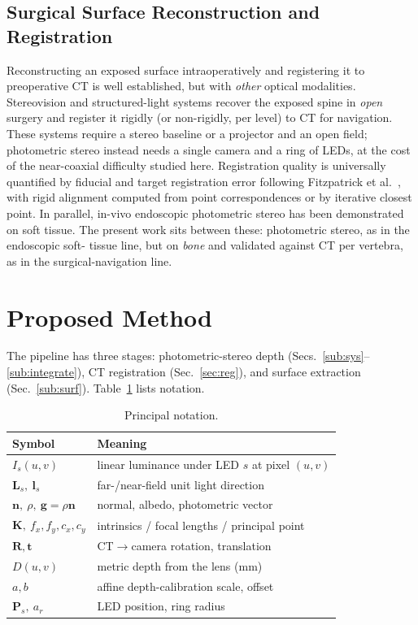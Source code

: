 \documentclass[journal]{IEEEtran}
\newcommand{\vn}{\bm{n}}
\newcommand{\vl}{\bm{l}}
\newcommand{\vL}{\bm{L}}
\newcommand{\vg}{\bm{g}}
\newcommand{\vP}{\bm{P}}
\newcommand{\R}{\bm{R}}
\newcommand{\tvec}{\bm{t}}
\newcommand{\K}{\bm{K}}
\begin{document}
\subsection{Surgical Surface Reconstruction and Registration}
Reconstructing an exposed surface intraoperatively and registering it to preoperative
CT is well established, but with \emph{other} optical modalities. Stereovision and
structured-light systems recover the exposed spine in \emph{open} surgery and register
it rigidly (or non-rigidly, per level) to CT for navigation. These systems require a
stereo baseline or a projector and an open field; photometric stereo instead needs a
single camera and a ring of LEDs, at the cost of the near-coaxial difficulty studied
here. Registration quality is universally quantified by fiducial and target
registration error following Fitzpatrick et al.~\cite{fitzpatrick}, with rigid
alignment computed from point correspondences or by iterative closest point. In
parallel, in-vivo endoscopic photometric stereo has been demonstrated on soft tissue.
The present work sits between these: photometric stereo, as in the endoscopic soft-
tissue line, but on \emph{bone} and validated against CT per vertebra, as in the
surgical-navigation line.

\section{Proposed Method}\label{sec:method}
The pipeline has three stages: photometric-stereo depth
(Secs.~\ref{sub:sys}--\ref{sub:integrate}), CT registration (Sec.~\ref{sec:reg}),
and surface extraction (Sec.~\ref{sub:surf}). Table~\ref{tab:notation} lists notation.

\begin{table}[t]\centering
\caption{Principal notation.}\label{tab:notation}
\small
\begin{tabular}{ll}
\toprule
Symbol & Meaning\\
\midrule
$I_s(u,v)$ & linear luminance under LED $s$ at pixel $(u,v)$\\
$\vL_s,\ \vl_s$ & far-/near-field unit light direction\\
$\vn,\ \rho,\ \vg{=}\rho\vn$ & normal, albedo, photometric vector\\
$\K,\ f_x,f_y,c_x,c_y$ & intrinsics / focal lengths / principal point\\
$\R,\tvec$ & CT$\to$camera rotation, translation\\
$D(u,v)$ & metric depth from the lens (\si{\milli\meter})\\
$a,b$ & affine depth-calibration scale, offset\\
$\vP_s,\ a_r$ & LED position, ring radius\\
\bottomrule
\end{tabular}
\end{table}
\end{document}
